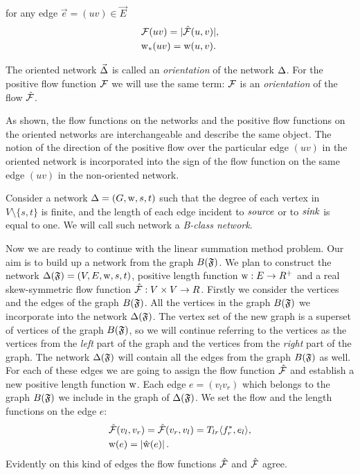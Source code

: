 \documentclass[12pt]{article}
\begin{document}
    for any edge $\vec{e} = (uv) \in \vec{E}$
    \begin{align*}
      &\mathcal{F}(uv) = |\mathcal{\hat{F}}(u,v)|,\\
      &\mathrm{w}_{*}(uv) = \mathrm{w}(u,v).
    \end{align*}
    \begin{definition}
      The oriented network $\vec{\Delta}$ is called an \emph{orientation} of the network $\Delta$.
      For the positive flow function $\mathcal{F}$ we will use the same term:
        $\mathcal{F}$ is an \emph{orientation} of the flow $\mathcal{\hat{F}}$.
    \end{definition}
    \begin{remark}
      As shown, the flow functions on the networks and the positive flow functions on the oriented networks
        are interchangeable and describe the same object.
      The notion of the direction of the positive flow over the particular edge $(uv)$ in the oriented network
        is incorporated into the sign of the flow function on the same edge $(uv)$ in the non-oriented network.
    \end{remark}
    \begin{definition}
      Consider a network $\Delta = (G, \mathrm{w}, s, t)$ such that
        the degree of each vertex in $V \setminus \{s, t\} $ is finite,
        and the length of each edge incident to $\mathit{source}$ or to $\mathit{sink}$ is equal to one.
      We will call such network a \emph{B-class network}.
    \end{definition}
    
    Now we are ready to continue with the linear summation method problem.
    Our aim is to build up a network from the graph $B(\mathfrak{F})$.
    We plan to construct the network $\Delta(\mathfrak{F}) = (V, E, \mathrm{w}, s, t)$,
    positive length function $\mathrm{w}: E \to R^{+}$ and a real skew-symmetric flow function $\mathcal{\hat{F}}: V \times V \to R$.
    Firstly we consider the vertices and the edges of the graph $B(\mathfrak{F})$.
    All the vertices in the graph $B(\mathfrak{F})$ we incorporate into the network $\Delta(\mathfrak{F})$.
    The vertex set of the new graph is a superset of vertices of the graph $B(\mathfrak{F})$,
    so we will continue referring to the vertices as the vertices from 
    the \emph{left} part of the graph and the vertices from the \emph{right} part of the graph.
    The network $\Delta(\mathfrak{F})$ will contain all the edges from the graph $B(\mathfrak{F})$ as well.
    For each of these edges we are going to assign the flow function $\mathcal{\hat{F}}$ and
    establish a new positive length function $\mathrm{w}$.
    Each edge $e = (v_l v_r)$ which belongs to the graph $B(\mathfrak{F})$ we include in the graph of $\Delta(\mathfrak{F})$.
    We set the flow and the length functions on the edge $e$:
    \begin{align*}
      &\mathcal{\hat{F}}(v_l, v_r) = \mathcal{\hat{F}}(v_r, v_l) = T_{lr} \langle f^*_r, e_l \rangle,\\
      &\mathrm{w}(e) = \left| \mathrm{\hat{w}}(e) \right|.
    \end{align*}
    Evidently on this kind of edges the flow functions $\mathcal{\hat{F}}$ and $\mathcal{\hat{F}}$ agree.
    
\end{document}
